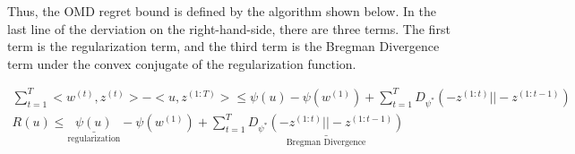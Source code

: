 \documentclass[11pt]{article}
\begin{document}
Thus, the OMD regret bound is defined by the algorithm shown below. In the last line of the derviation on the right-hand-side, there are three terms. The first term is the regularization term, and the third term is the Bregman Divergence term under the convex conjugate of the regularization function.

\begin{gather*}
    \sum_{t=1}^T <w^{(t)}, z^{(t)}> - <u, z^{(1:T)} > \leq \psi (u) - \psi (w^{(1)}) + \sum_{t=1}^T D_{\psi^*} (-z^{(1:t)}||-z^{(1:t-1)})  \\ 
    R(u) \leq \underset{\text{regularization}}{\underline{\psi (u)}} - \psi (w^{(1)}) + \sum_{t=1}^T \underset{\text{Bregman Divergence}}{\underline{D_{\psi^*} (-z^{(1:t)}||-z^{(1:t-1)})}} \\
\end{gather*}

\newpage
 



\end{document}

